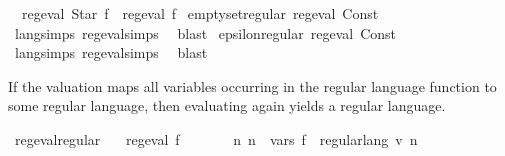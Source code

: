\begin{isabellebody}
\ \ {\isachardoublequoteopen}reg{\isacharunderscore}{\kern0pt}eval\ {\isacharparenleft}{\kern0pt}Star\ f{\isacharparenright}{\kern0pt}\ {\isasymlongleftrightarrow}\ reg{\isacharunderscore}{\kern0pt}eval\ f{\isachardoublequoteclose}\isanewline
\isanewline
\isanewline
{}\isamarkupfalse%
\ emptyset{\isacharunderscore}{\kern0pt}regular{\isacharcolon}{\kern0pt}\ {\isachardoublequoteopen}reg{\isacharunderscore}{\kern0pt}eval\ {\isacharparenleft}{\kern0pt}Const\ {\isacharbraceleft}{\kern0pt}{\isacharbraceright}{\kern0pt}{\isacharparenright}{\kern0pt}{\isachardoublequoteclose}\isanewline
%
\isadelimproof
\ \ %
\endisadelimproof
%
\isatagproof
{}\isamarkupfalse%
\ lang{\isachardot}{\kern0pt}simps{\isacharparenleft}{\kern0pt}{}{\isacharparenright}{\kern0pt}\ reg{\isacharunderscore}{\kern0pt}eval{\isachardot}{\kern0pt}simps{\isacharparenleft}{\kern0pt}{}{\isacharparenright}{\kern0pt}\ \isamarkupfalse%
\ blast%
\endisatagproof
{\isafoldproof}%
%
\isadelimproof
\isanewline
%
\endisadelimproof
\isanewline
{}\isamarkupfalse%
\ epsilon{\isacharunderscore}{\kern0pt}regular{\isacharcolon}{\kern0pt}\ {\isachardoublequoteopen}reg{\isacharunderscore}{\kern0pt}eval\ {\isacharparenleft}{\kern0pt}Const\ {\isacharbraceleft}{\kern0pt}{\isacharbrackleft}{\kern0pt}{\isacharbrackright}{\kern0pt}{\isacharbraceright}{\kern0pt}{\isacharparenright}{\kern0pt}{\isachardoublequoteclose}\isanewline
%
\isadelimproof
\ \ %
\endisadelimproof
%
\isatagproof
{}\isamarkupfalse%
\ lang{\isachardot}{\kern0pt}simps{\isacharparenleft}{\kern0pt}{}{\isacharparenright}{\kern0pt}\ reg{\isacharunderscore}{\kern0pt}eval{\isachardot}{\kern0pt}simps{\isacharparenleft}{\kern0pt}{}{\isacharparenright}{\kern0pt}\ \isamarkupfalse%
\ blast%
\endisatagproof
{\isafoldproof}%
%
\isadelimproof
%
\endisadelimproof
%
\begin{isamarkuptext}%
If the valuation  maps all variables occurring in the regular language function  to
some regular language, then evaluating  again yields a regular language.%
\end{isamarkuptext}\isamarkuptrue%
\isamarkupfalse%
\ reg{\isacharunderscore}{\kern0pt}eval{\isacharunderscore}{\kern0pt}regular{\isacharcolon}{\kern0pt}\isanewline
\ \ \ {\isachardoublequoteopen}reg{\isacharunderscore}{\kern0pt}eval\ f{\isachardoublequoteclose}\isanewline
\ \ \ \ \ \ \ {\isachardoublequoteopen}{\isasymAnd}n{\isachardot}{\kern0pt}\ n\ {\isasymin}\ vars\ f\ {\isasymLongrightarrow}\ regular{\isacharunderscore}{\kern0pt}lang\ {\isacharparenleft}{\kern0pt}v\ n{\isacharparenright}{\kern0pt}{\isachardoublequoteclose}\isanewline

\end{isabellebody}
